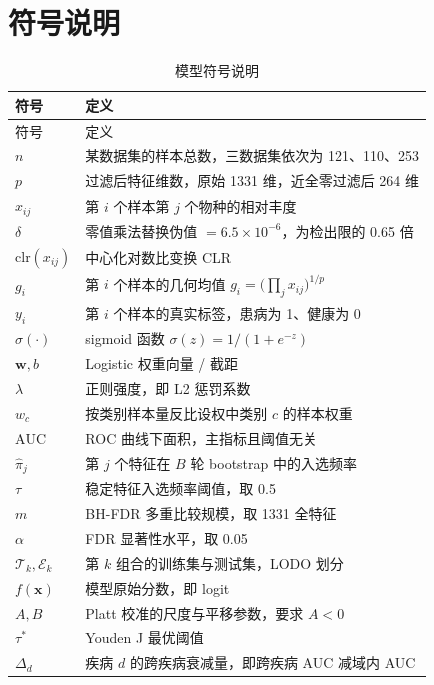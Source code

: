 \section{符号说明}

{\footnotesize
\begin{longtable}{>{\centering\arraybackslash}p{}>{\centering\arraybackslash}p{}}
\caption{模型符号说明}
\label{tab:notation}\\
\toprule
符号 & 定义 \\
\midrule
\endfirsthead
\toprule
符号 & 定义 \\
\midrule
\endhead
\bottomrule
\endlastfoot
$n$ & 某数据集的样本总数，三数据集依次为 121、110、253 \\
$p$ & 过滤后特征维数，原始 1331 维，近全零过滤后 264 维 \\
$x_{ij}$ & 第 $i$ 个样本第 $j$ 个物种的相对丰度 \\
$\delta$ & 零值乘法替换伪值 $=6.5\times10^{-6}$，为检出限的 0.65 倍 \\
$\mathrm{clr}(x_{ij})$ & 中心化对数比变换 CLR \\
$g_i$ & 第 $i$ 个样本的几何均值 $g_i=\big(\prod_j x_{ij}\big)^{1/p}$ \\
$y_i$ & 第 $i$ 个样本的真实标签，患病为 1、健康为 0 \\
$\sigma(\cdot)$ & sigmoid 函数 $\sigma(z)=1/(1+e^{-z})$ \\
$\mathbf{w},b$ & Logistic 权重向量 / 截距 \\
$\lambda$ & 正则强度，即 L2 惩罚系数 \\
$w_c$ & 按类别样本量反比设权中类别 $c$ 的样本权重 \\
$\mathrm{AUC}$ & ROC 曲线下面积，主指标且阈值无关 \\
$\hat{\pi}_j$ & 第 $j$ 个特征在 $B$ 轮 bootstrap 中的入选频率 \\
$\tau$ & 稳定特征入选频率阈值，取 0.5 \\
$m$ & BH-FDR 多重比较规模，取 1331 全特征 \\
$\alpha$ & FDR 显著性水平，取 0.05 \\
$\mathcal{T}_k,\mathcal{E}_k$ & 第 $k$ 组合的训练集与测试集，LODO 划分 \\
$f(\mathbf{x})$ & 模型原始分数，即 logit \\
$A,B$ & Platt 校准的尺度与平移参数，要求 $A<0$ \\
$\tau^{*}$ & Youden J 最优阈值 \\
$\Delta_d$ & 疾病 $d$ 的跨疾病衰减量，即跨疾病 AUC 减域内 AUC \\
\end{longtable}
}
